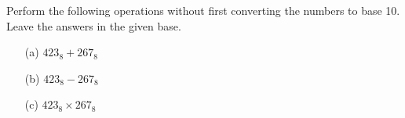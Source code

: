 Perform the following operations without first converting the numbers to base
10.
Leave the answers in the given base.
\begin{enumerate}[label=\alph*.,nosep]
\item[(a)] $423_8 + 267_8$	
\item[(b)] $423_8 - 267_8$ 	
\item[(c)] $423_8 \times 267_8$
\end{enumerate}
